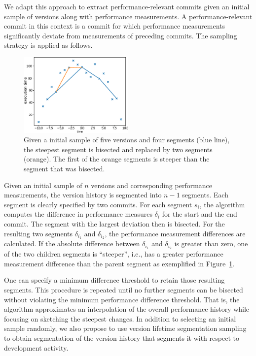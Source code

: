 We adapt this approach to extract performance-relevant commits given an initial
sample of versions along with performance measurements. A performance-relevant
commit in this context is a commit for which performance measurements
significantly deviate from measurements of preceding commits. The sampling
strategy is applied as follows. 

\begin{figure}
 \begin{center}
   \includegraphics[width=0.5\textwidth]{images/inverse_douglas_peucker}
 \end{center}
\vspace{-5pt}
 \caption{Given a initial sample of five versions and four segments (blue
 line), the steepest segment is bisected and replaced by two segments
 (orange).
The first of the orange segments is steeper than the segment that was
bisected. \label{fig:example_bisection}}
\end{figure}

Given an initial sample of $n$ versions and
corresponding performance measurements, the version history is segmented into
$n-1$ segments. Each segment is clearly specified by two commits. For each
segment $s_i$, the algorithm computes the difference in performance
 measures $\delta_i$ for the start and the end commit. The segment with the
 largest deviation then is bisected. For the resulting two segments $\delta_{i_1}$ and $\delta_{i_2}$, the performance measurement differences are calculated. If the
absolute difference between $\delta_{i_1}$ and  $\delta_{i_2}$ is greater than
zero, one of the two children segments is ``steeper'', i.e., has a greater
performance measurement difference than the parent segment as exemplified in
Figure~\ref{fig:example_bisection}.

One can specify a minimum difference threshold to retain those resulting
segments. This procedure is repeated until no further segments can be bisected without violating the
minimum performance difference threshold. That is, the algorithm approximates
an interpolation of the overall performance history while focusing on sketching
the steepest changes. In addition to selecting an initial sample randomly, we
also propose to use version lifetime segmentation sampling to obtain
segmentation of the version history that segments it with respect to development
activity.

